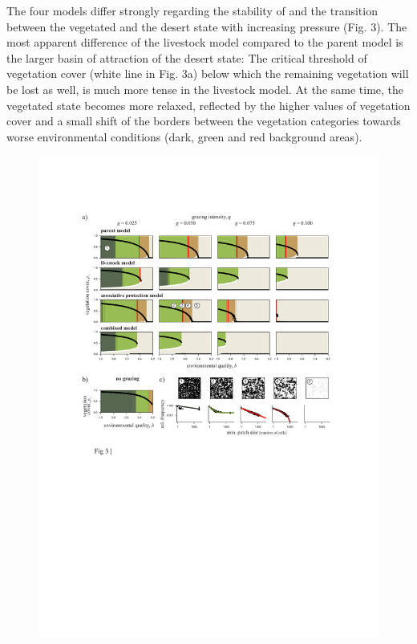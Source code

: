 The four models differ strongly regarding the stability of and the transition between the vegetated and the desert state with increasing pressure (Fig. 3). The most apparent difference of the livestock model compared to the parent model is the larger basin of attraction of the desert state: The critical threshold of vegetation cover (white line in Fig. 3a) below which the remaining vegetation will be lost as well, is much more tense in the livestock model. At the same time, the vegetated state becomes more relaxed, reflected by the higher values of vegetation cover and a small shift of the borders between the vegetation categories towards worse environmental conditions (dark, green and red background areas).

\begin{figure}[t]%
\includegraphics[width=\columnwidth]{figures/fig3.pdf}%
\caption{}%
\label{}%
\end{figure}

